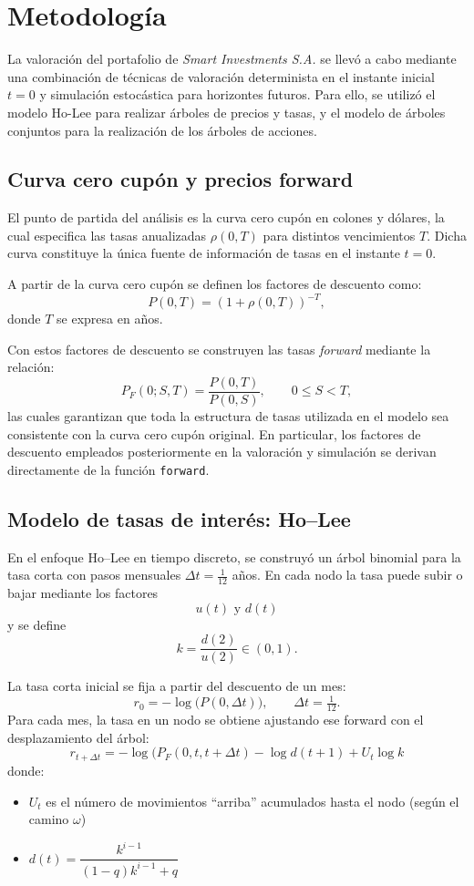 \documentclass[12pt, a4paper]{article}
\begin{document}
\section{Metodología}

La valoración del portafolio de \textit{Smart Investments S.A.} se llevó a cabo mediante una combinación de técnicas de valoración determinista en el instante inicial \(t=0\) y simulación estocástica para horizontes futuros. Para ello, se utilizó el modelo Ho-Lee para realizar árboles de precios y tasas, y el modelo de árboles conjuntos para la realización de los árboles de acciones.

\subsection{Curva cero cupón y precios forward}

El punto de partida del análisis es la curva cero cupón en colones y dólares, la cual especifica las tasas anualizadas \(\rho(0,T)\) para distintos vencimientos \(T\). Dicha curva constituye la única fuente de información de tasas en el instante \(t=0\).

A partir de la curva cero cupón se definen los factores de descuento como:
\[
P(0,T) = (1 + \rho(0,T))^{-T},
\]
donde \(T\) se expresa en años.

Con estos factores de descuento se construyen las tasas \textit{forward} mediante la relación:
\[
P_F(0; S,T) = \frac{P(0,T)}{P(0,S)}, \qquad 0 \leq S < T,
\]
las cuales garantizan que toda la estructura de tasas utilizada en el modelo sea consistente con la curva cero cupón original. En particular, los factores de descuento empleados posteriormente en la valoración y simulación se derivan directamente de la función \texttt{forward}.

\subsection{Modelo de tasas de interés: Ho–Lee}

En el enfoque Ho–Lee en tiempo discreto, se construyó un árbol binomial para la tasa corta con pasos mensuales $\Delta t=\tfrac{1}{12}$ años. En cada nodo la tasa puede subir o bajar mediante los factores
\[
u(t) \text{ y } d(t)
\]
y se define
\[
k=\frac{d(2)}{u(2)}\in(0,1).
\]

La tasa corta inicial se fija a partir del descuento de un mes:
$$
r_0=-\log\bigl(P(0,\Delta t)\bigr),
\qquad \Delta t=\tfrac{1}{12}.
$$
Para cada mes, la tasa en un nodo se obtiene ajustando ese forward con el desplazamiento del árbol:
$$
r_{t+\Delta t} =
-\log\bigl(P_F(0,t,t+\Delta t)
-\log d(t+1)
+U_t\log k
$$
donde:
\begin{itemize}
    \item $U_t$ es el número de movimientos “arriba” acumulados hasta el nodo (según el camino $\omega$)
    \item $d(t)=\dfrac{k^{i-1}}{(1-q)k^{i-1}+q}$
\end{itemize}
\end{document}
